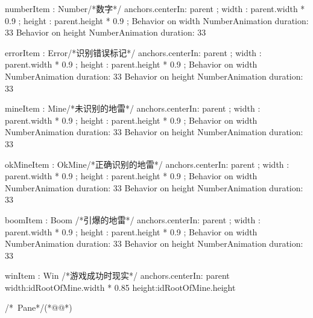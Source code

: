 \begin{thebookfilesourceone}[escapeinside={(*@}{@*)},
caption=GoodLuck,
title=\filesourcenumbernameone \thefilesourcenumber
]
{{        numberItem : Number{/*数字*/
            anchors.centerIn: parent ;
            width  : parent.width * 0.9 ;
            height : parent.height * 0.9 ;
            Behavior on width{
                NumberAnimation{
                    duration: 33
                }
            }
            Behavior on height{
                NumberAnimation{
                    duration: 33
                }
            }
        }

        errorItem : Error{/*识别错误标记*/
            anchors.centerIn: parent ;
            width  : parent.width * 0.9 ;
            height : parent.height * 0.9 ;
            Behavior on width{
                NumberAnimation{
                    duration: 33
                }
            }
            Behavior on height{
                NumberAnimation{
                    duration: 33
                }
            }
        }

        mineItem : Mine{/*未识别的地雷*/
            anchors.centerIn: parent ;
            width  : parent.width * 0.9 ;
            height : parent.height * 0.9 ;
            Behavior on width{
                NumberAnimation{
                    duration: 33
                }
            }
            Behavior on height{
                NumberAnimation{
                    duration: 33
                }
            }
        }

        okMineItem : OkMine{/*正确识别的地雷*/
            anchors.centerIn: parent ;
            width  : parent.width * 0.9 ;
            height : parent.height * 0.9 ;
            Behavior on width{
                NumberAnimation{
                    duration: 33
                }
            }
            Behavior on height{
                NumberAnimation{
                    duration: 33
                }
            }
        }

        boomItem : Boom {/*引爆的地雷*/
            anchors.centerIn: parent ;
            width  : parent.width * 0.9 ;
            height : parent.height * 0.9 ;
            Behavior on width{
                NumberAnimation{
                    duration: 33
                }
            }
            Behavior on height{
                NumberAnimation{
                    duration: 33
                }
            }
        }

        winItem : Win {/*游戏成功时现实*/
            anchors.centerIn: parent
            width:idRootOfMine.width * 0.85
            height:idRootOfMine.height
        }

    }

}/*~Pane*/(*@\marginpar[\hfill\setlength\fboxsep{2pt}\fbox{\footnotesize{\kaishu\parbox{1em}{\setlength{\baselineskip}{2pt}\filesourcenumbernameone}}\footnotesize{\thefilesourcenumber}}]{\setlength\fboxsep{2pt}\fbox{\footnotesize{\kaishu\parbox{1em}{\setlength{\baselineskip}{2pt}\filesourcenumbernameone}}\footnotesize{\thefilesourcenumber}}}@*)\end{thebookfilesourceone}          %
\addtocounter{lstlisting}{-1}   %


